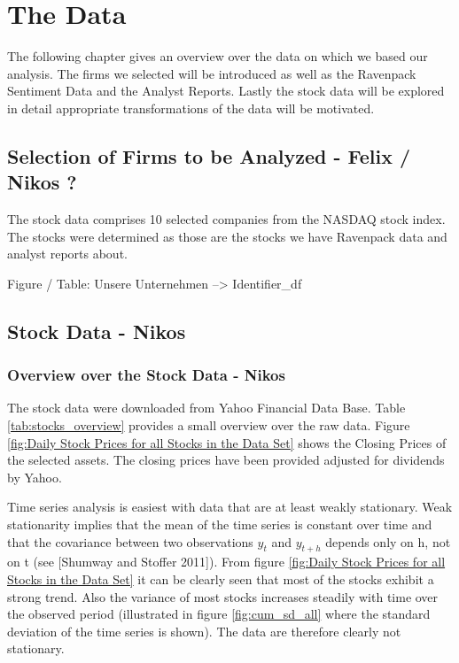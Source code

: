 \chapter{The Data}
The following chapter gives an overview over the data on which we based our analysis. The firms we selected will be introduced as well as the Ravenpack Sentiment Data and the Analyst Reports. Lastly the stock data will be explored in detail appropriate transformations of the data will be motivated. 


\section{Selection of Firms to be Analyzed - Felix / Nikos ? }
The stock data comprises 10 selected companies from the NASDAQ stock index. The stocks were determined as those are the stocks we have Ravenpack data and analyst reports about. 

Figure / Table: Unsere Unternehmen --> Identifier\_df



\section{Stock Data - Nikos}
\subsection{Overview over the Stock Data - Nikos}
The stock data were downloaded from Yahoo Financial Data Base. Table \ref{tab:stocks_overview} provides a small overview over the raw data. Figure \ref{fig:Daily Stock Prices for all Stocks in the Data Set} shows the Closing Prices of the selected assets. The closing prices have been provided adjusted for dividends by Yahoo. 

\begin{table}[h!]
    \centering
    \begin{adjustbox}{width = 0.9\linewidth}
    \setlength{\tabcolsep}{15pt}
    
    \end{adjustbox}
    \caption{}
    \label{tab:stocks_overview}
\end{table}{}

Time series analysis is easiest with data that are at least weakly stationary. Weak stationarity implies that the mean of the time series is constant over time and that the covariance between two observations $y_t$ and $y_{t+h}$ depends only on h, not on t (see [Shumway and Stoffer 2011]). From figure \ref{fig:Daily Stock Prices for all Stocks in the Data Set} it can be clearly seen that most of the stocks exhibit a strong trend. Also the variance of most stocks increases steadily with time over the observed period (illustrated in figure \ref{fig:cum_sd_all} where the standard deviation of the time series is shown). The data are therefore clearly not stationary. %


